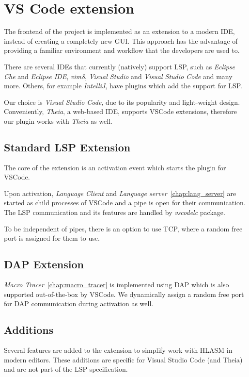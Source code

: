 \chapter{VS Code extension}

The frontend of the project is implemented as an extension to a modern IDE, instead of creating a completely new GUI. This approach has the advantage of providing a familiar environment and workflow that the developers are used to.

There are several IDEs that currently (natively) support LSP, such as \emph{Eclipse Che} and \emph{Eclipse IDE}, \emph{vim8}, \emph{Visual Studio} and \emph{Visual Studio Code} and many more. Others, for example \emph{IntelliJ}, have plugins which add the support for LSP.

Our choice is \emph{Visual Studio Code}, due to its popularity and light-weight design. Conveniently, \emph{Theia}, a web-based IDE, supports VSCode extensions, therefore our plugin works with \emph{Theia} as well.

\section{Standard LSP Extension}

The core of the extension is an activation event which starts the plugin for VSCode.

Upon activation, \emph{Language Client} and \emph{Language server}~\ref{chap:lang_server} are started as child processes of VSCode and a pipe is open for their communication. The LSP communication and its features are handled by \emph{vscodelc} package. 

To be independent of pipes, there is an option to use TCP, where a random free port is assigned for them to use.

\section{DAP Extension}

\emph{Macro Tracer}~\ref{chap:macro_tracer} is implemented using DAP which is also supported out-of-the-box by VSCode. We dynamically assign a random free port for DAP communication during activation as well.

\section{Additions}

Several features are added to the extension to simplify work with HLASM in modern editors. These additions are specific for Visual Studio Code (and Theia) and are not part of the LSP specification.

